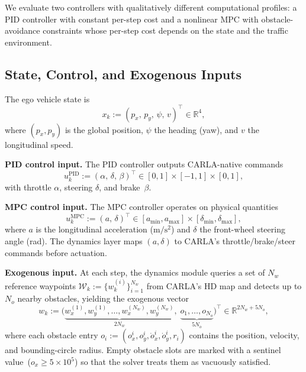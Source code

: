 \documentclass[conference]{IEEEtran}
\newcommand{\R}{\mathbb{R}}
\newcommand{\calW}{\mathcal{W}}
\begin{document}
We evaluate two controllers with qualitatively different
computational profiles: a PID controller with constant per-step
cost and a nonlinear MPC with obstacle-avoidance constraints whose
per-step cost depends on the state and the traffic environment.

\subsection{State, Control, and Exogenous Inputs}\label{sec:state}

The ego vehicle state is
\begin{equation}\label{eq:state}
  x_k := (p_x,\, p_y,\, \psi,\, v)^\top \in \R^4,
\end{equation}
where $(p_x, p_y)$ is the global position, $\psi$ the heading
(yaw), and $v$ the longitudinal speed.

\noindent\textbf{PID control input.}
The PID controller outputs CARLA-native commands
\begin{equation}\label{eq:control_pid}
  u_k^{\mathrm{PID}} := (\alpha,\, \delta,\, \beta)^\top
  \in [0,1]\times[-1,1]\times[0,1],
\end{equation}
with throttle $\alpha$, steering $\delta$, and brake~$\beta$.

\noindent\textbf{MPC control input.}
The MPC controller operates on physical quantities
\begin{equation}\label{eq:control_mpc}
  u_k^{\mathrm{MPC}} := (a,\, \delta)^\top
  \in [a_{\min}, a_{\max}] \times [\delta_{\min}, \delta_{\max}],
\end{equation}
where $a$ is the longitudinal acceleration
($\mathrm{m/s^2}$) and $\delta$ the front-wheel steering angle
(rad).  The dynamics layer maps $(a, \delta)$ to
CARLA's throttle/brake/steer commands before actuation.

\noindent\textbf{Exogenous input.}
At each step, the dynamics module queries a set of
$N_w$ reference waypoints
$\calW_k := \{w^{(i)}_k\}_{i=1}^{N_w}$ from CARLA's HD map
and detects up to $N_o$ nearby obstacles, yielding the exogenous
vector
\begin{equation}\label{eq:exo}
  w_k := \bigl(\underbrace{w_{x}^{(1)},w_{y}^{(1)},\ldots,
    w_{x}^{(N_w)},w_{y}^{(N_w)}}_{2N_w},\;
  \underbrace{o_1,\ldots,o_{N_o}}_{5N_o}\bigr)^\top
  \in \R^{2N_w + 5N_o},
\end{equation}
where each obstacle entry
$o_i := (o_x^i, o_y^i, \dot{o}_x^i, \dot{o}_y^i, r_i)$
contains the position, velocity, and bounding-circle radius.
Empty obstacle slots are marked with a sentinel value~($o_x \ge 5\!\times\!10^5$)
so that the solver treats them as vacuously satisfied.
\end{document}
